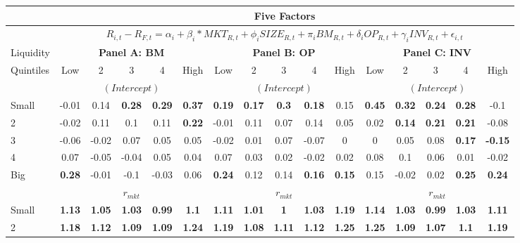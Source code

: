 \begin{table}[H]
\tiny
\centering
\begin{tabular}{lccccc|ccccc|ccccc}
\hline
& \multicolumn{15}{c}{Five Factors} \\ \hline
& \multicolumn{15}{c}{\tiny $R_{i,t} - R_{F,t} = \alpha_i+\beta_i*MKT_{R,t} + \phi_iSIZE_{R,t}+\pi_iBM_{R,t} + \delta_iOP_{R,t}+\gamma_iINV_{R,t} + \epsilon_{i,t}$} \\ \hline
Liquidity & \multicolumn{5}{c|}{\textbf{Panel A: BM}} & \multicolumn{5}{c|}{\textbf{Panel B: OP}} & \multicolumn{5}{c}{\textbf{Panel C: INV}} \\
Quintiles & Low & 2 & 3 & 4 & High & Low & 2 & 3 & 4 & High & Low & 2 & 3 & 4 & High \\  \hline
 & \multicolumn{5}{c|}{$(Intercept)$} & \multicolumn{5}{c|}{$(Intercept)$} & \multicolumn{5}{c}{$(Intercept)$} \\
Small & -0.01 & 0.14 & \textbf{0.28} & \textbf{0.29} & \textbf{0.37} & \textbf{0.19} & \textbf{0.17} & \textbf{0.3} & \textbf{0.18} & 0.15 & \textbf{0.45} & \textbf{0.32} & \textbf{0.24} & \textbf{0.28} & -0.1 \\
2 & -0.02 & 0.11 & 0.1 & 0.11 & \textbf{0.22} & -0.01 & 0.11 & 0.07 & 0.14 & 0.05 & 0.02 & \textbf{0.14} & \textbf{0.21} & \textbf{0.21} & -0.08 \\
3 & -0.06 & -0.02 & 0.07 & 0.05 & 0.05 & -0.02 & 0.01 & 0.07 & -0.07 & 0 & 0 & 0.05 & 0.08 & \textbf{0.17} & \textbf{-0.15} \\
4 & 0.07 & -0.05 & -0.04 & 0.05 & 0.04 & 0.07 & 0.03 & 0.02 & -0.02 & 0.02 & 0.08 & 0.1 & 0.06 & 0.01 & -0.02 \\
Big & \textbf{0.28} & -0.01 & -0.1 & -0.03 & 0.06 & \textbf{0.24} & 0.12 & 0.14 & \textbf{0.16} & \textbf{0.15} & 0.15 & -0.02 & 0.02 & \textbf{0.25} & \textbf{0.24} \\
 & \multicolumn{5}{c|}{$r_{mkt}$} & \multicolumn{5}{c|}{$r_{mkt}$} & \multicolumn{5}{c}{$r_{mkt}$} \\
Small & \textbf{1.13} & \textbf{1.05} & \textbf{1.03} & \textbf{0.99} & \textbf{1.1} & \textbf{1.11} & \textbf{1.01} & \textbf{1} & \textbf{1.03} & \textbf{1.19} & \textbf{1.14} & \textbf{1.03} & \textbf{0.99} & \textbf{1.03} & \textbf{1.11} \\
2 & \textbf{1.18} & \textbf{1.12} & \textbf{1.09} & \textbf{1.09} & \textbf{1.24} & \textbf{1.19} & \textbf{1.08} & \textbf{1.11} & \textbf{1.12} & \textbf{1.25} & \textbf{1.25} & \textbf{1.09} & \textbf{1.07} & \textbf{1.1} & \textbf{1.19} \\

\end{tabular}
\end{table}
